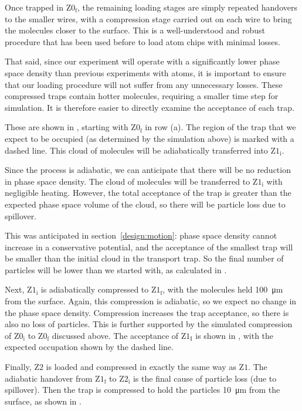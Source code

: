 Once trapped in $\mathrm{Z0_f}$, the remaining loading stages are simply
repeated handovers to the smaller wires, with a compression stage carried out
on each wire to bring the molecules closer to the surface. This is a
well-understood and robust procedure that has been used before to load atom
chips with minimal losses.~\cite{Reichel2002}

That said, since our experiment will operate with a significantly lower phase
space density than previous experiments with atoms, it is important to ensure
that our loading procedure will not suffer from any unnecessary losses. These
compressed traps contain hotter molecules, requiring a smaller time step for
simulation. It is therefore easier to directly examine the acceptance of each
trap.

These are shown in , starting with
$\mathrm{Z0_f}$ in row (a). The region of the trap that we expect to be
occupied (as determined by the simulation above) is marked with a dashed line.
This cloud of molecules will be adiabatically transferred into $\mathrm{Z1_i}$.

Since the process is adiabatic, we can anticipate that there will be no
reduction in phase space density. The cloud of molecules will be transferred to
$\mathrm{Z1_i}$ with negligible heating. However, the total acceptance of the
trap is greater than the expected phase space volume of the cloud, so there
will be particle loss due to spillover.

This was anticipated in section~\ref{design:motion}: phase space density cannot
increase in a conservative potential, and the acceptance of the smallest trap
will be smaller than the initial cloud in the transport trap. So the final
number of particles will be lower than we started with, as calculated in
.

Next, $\mathrm{Z1_i}$ is adiabatically compressed to $\mathrm{Z1_f}$, with the
molecules held \SI{100}{\micro\meter} from the surface. Again, this
compression is adiabatic, so we expect no change in the phase space density.
Compression increases the trap acceptance, so there is also no loss of
particles. This is further supported by the simulated compression of
$\mathrm{Z0_i}$ to $\mathrm{Z0_f}$ discussed above. The acceptance of
$\mathrm{Z1_I}$ is shown in , with
the expected occupation shown by the dashed line.

Finally, $\mathrm{Z2}$ is loaded and compressed in exactly the same way as
$\mathrm{Z1}$. The adiabatic handover from $\mathrm{Z1_f}$ to $\mathrm{Z2_i}$
is the final cause of particle loss (due to spillover). Then the trap is
compressed to hold the particles \SI{10}{\micro\meter} from the surface, as
shown in .


